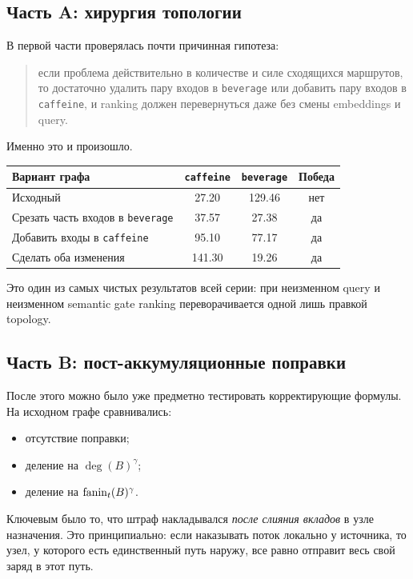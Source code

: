 \subsection{Часть A: хирургия топологии}

В первой части проверялась почти причинная гипотеза:

\begin{quote}
если проблема действительно в количестве и силе сходящихся маршрутов, то
достаточно удалить пару входов в \texttt{beverage} или добавить пару входов в
\texttt{caffeine}, и ranking должен перевернуться даже без смены embeddings и
query.
\end{quote}

Именно это и произошло.

\begin{center}
\begin{tabular}{lccc}
\toprule
Вариант графа & \texttt{caffeine} & \texttt{beverage} & Победа \\
\midrule
Исходный & 27.20 & 129.46 & нет \\
Срезать часть входов в \texttt{beverage} & 37.57 & 27.38 & да \\
Добавить входы в \texttt{caffeine} & 95.10 & 77.17 & да \\
Сделать оба изменения & 141.30 & 19.26 & да \\
\bottomrule
\end{tabular}
\end{center}

Это один из самых чистых результатов всей серии: при неизменном query и
неизменном semantic gate ranking переворачивается одной лишь правкой topology.

\subsection{Часть B: пост-аккумуляционные поправки}

После этого можно было уже предметно тестировать корректирующие формулы. На
исходном графе сравнивались:

\begin{itemize}[leftmargin=2em]
\item отсутствие поправки;
\item деление на $\deg(B)^\gamma$;
\item деление на $\mathrm{fanin}_t(B)^\gamma$.
\end{itemize}

Ключевым было то, что штраф накладывался \emph{после слияния вкладов} в узле
назначения. Это принципиально: если наказывать поток локально у источника, то
узел, у которого есть единственный путь наружу, все равно отправит весь свой
заряд в этот путь.

